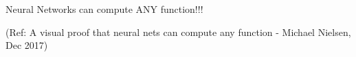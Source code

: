 \begin{frame}
  \begin{center}
    {\Large Neural Networks can compute ANY function!!!}
    
    {\tiny (Ref: A visual proof that neural nets can compute any function - Michael Nielsen, Dec 2017)}
  \end{center}
\end{frame}





